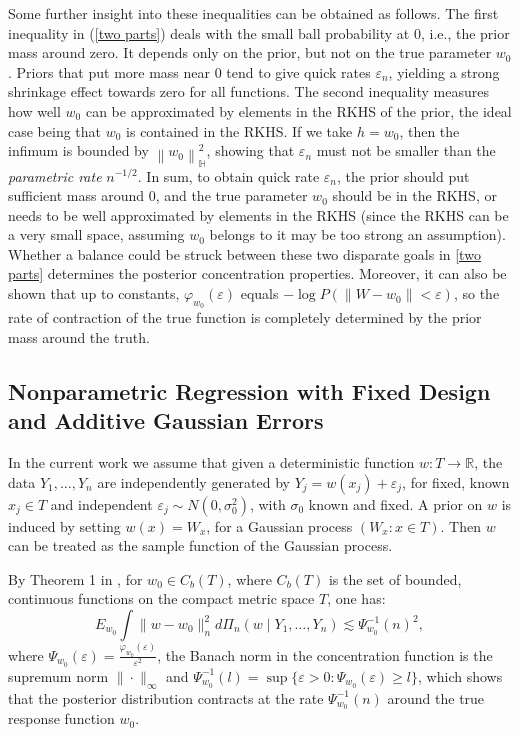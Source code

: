 \documentclass[ejs,noshowframe]{imsart}
\theoremstyle{plain}
\theoremstyle{definition}
\theoremstyle{remark}
\begin{document}
Some further insight into these inequalities can be obtained as follows. The first inequality in (\ref{two parts}) deals with  the small ball probability at 0, i.e., the prior mass around zero. It depends only on the prior,
but not on the true parameter $w_0$.  Priors that put more mass near 0 tend to give quick rates $\varepsilon_n$, yielding a strong shrinkage effect towards zero for all functions. The second inequality measures how well $w_0$ can be approximated by elements in the RKHS of the prior, the ideal case being that $w_0$ is contained in the RKHS.  If we take $h=w_0$, then the infimum is bounded by $\left\|w_0\right\|_{\mathbb{H}}^2$, showing that $\varepsilon_n$ must not be smaller than  the \emph{parametric rate} $n^{-1/2}$. In sum, to obtain quick rate $\varepsilon_n$,  the prior should put sufficient mass around 0, and  the true parameter $w_0$ should be in the RKHS, or needs to be well approximated by elements in the RKHS (since  the RKHS can be a very small space, assuming $w_0$ belongs to it may be too strong an assumption). Whether a balance could be struck between these two disparate goals in \eqref{two parts} determines the posterior concentration properties. Moreover, it can also be shown \citep{van2008reproducing} that up to constants, $\varphi_{w_0}(\varepsilon)$ equals $-\log P(\|W-w_0\|<\varepsilon)$, so the rate of contraction of the true function is completely determined by the prior mass around the truth.




\subsection{Nonparametric Regression with Fixed Design and Additive Gaussian Errors} \label{section2.4}
In the current  work we assume that given a  deterministic function $w:T \to \mathbb{R}$, the data $Y_1, \ldots ,Y_n$ are independently generated by $Y_j = w(x_j)+\varepsilon_j$, for fixed, known $x_j \in T$ and independent $\varepsilon_j \sim N(0,\sigma_0^2)$, with $\sigma_0$ known and fixed. A prior on $w$ is induced by setting $w(x) = W_x$, for a Gaussian process $(W_x : x\in T)$. Then $w$ can be treated as the sample function of the Gaussian process.


By Theorem 1 in \cite{van2011information}, for $w_0 \in C_b(T)$, where $C_b(T)$ is the set of bounded, continuous functions on the compact metric space $T$, one has:
\begin{equation}
E_{w_0} \int \|w-w_0\|_n^2 d \Pi_n(w\mid Y_1,\ldots,Y_n) \lesssim \Psi^{-1}_{w_0}(n)^2,\label{eq:van}
\end{equation}
where $\Psi_{w_0}(\varepsilon)=\frac{\varphi_{w_0}(\varepsilon)}{\varepsilon^2}$, the Banach norm in the concentration function is the supremum norm $\|\cdot\|_{\infty}$ and $\Psi_{w_0}^{-1}({l})=\sup\{\varepsilon>0:\Psi_{w_0}(\varepsilon)\ge l\}$, which shows that the posterior distribution contracts at the rate $\Psi^{-1}_{w_0}(n)$ around the true response function $w_0$. %
\end{document}
